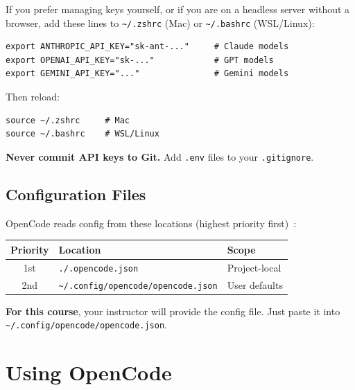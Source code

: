 \documentclass[11pt]{article}
\begin{document}
If you prefer managing keys yourself, or if you are on a headless server without a browser, add these lines to \texttt{\textasciitilde/.zshrc} (Mac) or \texttt{\textasciitilde/.bashrc} (WSL/Linux):

\begin{lstlisting}[style=term]
export ANTHROPIC_API_KEY="sk-ant-..."     # Claude models
export OPENAI_API_KEY="sk-..."            # GPT models
export GEMINI_API_KEY="..."               # Gemini models
\end{lstlisting}

Then reload:

\begin{lstlisting}[style=term]
source ~/.zshrc     # Mac
source ~/.bashrc    # WSL/Linux
\end{lstlisting}

\begin{alert-box}
\textbf{Never commit API keys to Git.} Add \texttt{.env} files to your \texttt{.gitignore}.
\end{alert-box}

\subsection{Configuration Files}

OpenCode reads config from these locations (highest priority first)~\cite{opencode_readme2025}:

\begin{center}
\begin{tabular}{cll}
\toprule
\textbf{Priority} & \textbf{Location} & \textbf{Scope} \\
\midrule
1st & \texttt{./.opencode.json} & Project-local \\
2nd & \texttt{\textasciitilde/.config/opencode/opencode.json} & User defaults \\
\bottomrule
\end{tabular}
\end{center}

\begin{ex-box}
\textbf{For this course}, your instructor will provide the config file.  Just paste it into \texttt{\textasciitilde/.config/opencode/opencode.json}.
\end{ex-box}

\section{Using OpenCode}
\end{document}
